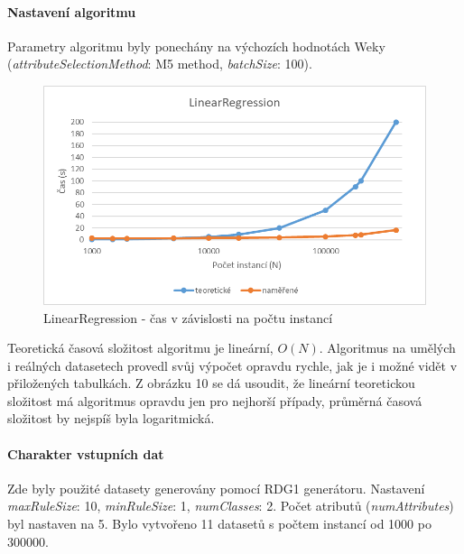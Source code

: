 \documentclass[12pt]{article}
\begin{document}
\paragraph{Nastavení algoritmu}
Parametry algoritmu byly ponechány na výchozích hodnotách Weky (\textit{attributeSelectionMethod}: M5 method, \textit{batchSize}: 100).
\begin{figure}[hbp]
  \centering
  \includegraphics[scale=1]{img/linear.png}
  \caption{LinearRegression - čas v závislosti na počtu instancí}
\end{figure}
Teoretická časová složitost algoritmu je lineární, $O(N)$. Algoritmus na umělých i reálných datasetech provedl svůj výpočet opravdu rychle, jak je i možné vidět v přiložených tabulkách. Z obrázku 10 se dá usoudit, že lineární teoretickou složitost má algoritmus opravdu jen pro nejhorší případy, průměrná časová složitost by nejspíš byla logaritmická. 

\newpage
{}
\paragraph{Charakter vstupních dat}
Zde byly použité datasety generovány pomocí RDG1 generátoru. Nastavení \textit{maxRuleSize}: 10, \textit{minRuleSize}: 1, \textit{numClasses}: 2. Počet atributů (\textit{numAttributes}) byl nastaven na 5. Bylo vytvořeno 11 datasetů s počtem instancí od 1000 po 300000.
\end{document}
